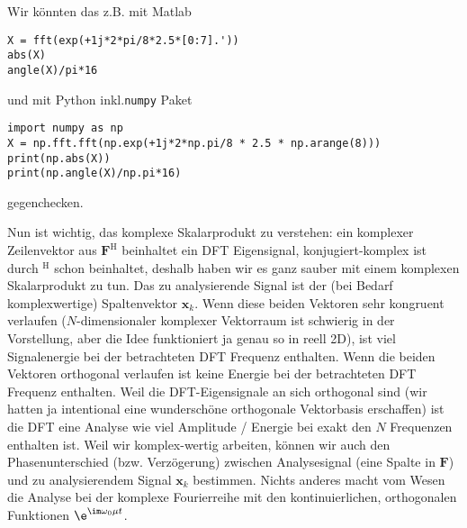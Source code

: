 \begin{ExCalc}

%
Wir könnten das z.B. mit Matlab
\begin{verbatim}
X = fft(exp(+1j*2*pi/8*2.5*[0:7].'))
abs(X)
angle(X)/pi*16
\end{verbatim}
und mit Python inkl.\texttt{numpy} Paket
\begin{verbatim}
import numpy as np
X = np.fft.fft(np.exp(+1j*2*np.pi/8 * 2.5 * np.arange(8)))
print(np.abs(X))
print(np.angle(X)/np.pi*16)
\end{verbatim}
gegenchecken.
%

Nun ist wichtig, das komplexe Skalarprodukt zu verstehen: ein komplexer
Zeilenvektor aus $\bm{F}^\mathrm{H}$ beinhaltet ein DFT Eigensignal,
konjugiert-komplex ist durch $^\mathrm{H}$ schon beinhaltet,
deshalb haben wir es ganz sauber mit einem komplexen Skalarprodukt zu tun.
Das zu analysierende Signal ist der (bei Bedarf komplexwertige) Spaltenvektor $\bm{x}_k$.
Wenn diese beiden Vektoren sehr kongruent verlaufen ($N$-dimensionaler
komplexer Vektorraum ist schwierig in der Vorstellung, aber die Idee funktioniert
ja genau so in reell 2D), ist viel Signalenergie
bei der betrachteten DFT Frequenz enthalten. Wenn die beiden Vektoren orthogonal
verlaufen ist keine Energie bei der betrachteten DFT Frequenz enthalten.
%
Weil die DFT-Eigensignale an sich orthogonal sind (wir hatten ja intentional
eine wunderschöne orthogonale
Vektorbasis erschaffen) ist die DFT eine Analyse wie viel Amplitude / Energie
bei exakt den $N$ Frequenzen enthalten ist. Weil wir komplex-wertig arbeiten, können
wir auch den Phasenunterschied (bzw. Verzögerung)
zwischen Analysesignal (eine Spalte in $\bm{F}$)
und zu analysierendem Signal $\bm{x}_k$ bestimmen. Nichts anderes macht vom Wesen
die Analyse bei der komplexe Fourierreihe mit den kontinuierlichen, orthogonalen
Funktionen $\e^{\im\omega_0 \mu t}$.
%


\end{ExCalc}
